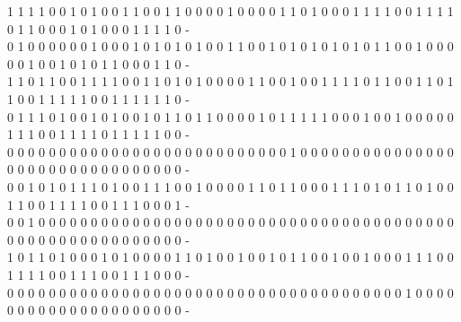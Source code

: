 \begin{center}
{1 1 1 1 0 0 1 0 1 0 0 1 1 0 0 1 1 0 0 0 0 1 0 0 0 0 1 1 0 1 0 0 0 1 1 1 1 0 0 1 1 1 1 0 1 1 0 0 0 1 0 1 0 0 0 1 1 1 1 0 -\\ 
0 1 0 0 0 0 0 0 1 0 0 0 1 0 1 0 1 0 1 0 0 1 1 0 0 1 0 1 0 1 0 1 0 1 0 1 1 0 0 1 0 0 0 0 0 1 0 0 1 0 1 0 1 1 0 0 0 1 1 0 -\\ 
1 1 0 1 1 0 0 1 1 1 1 0 0 1 1 0 1 0 1 0 0 0 0 1 1 0 0 1 0 0 1 1 1 1 0 1 1 0 0 1 1 0 1 1 0 0 1 1 1 1 1 0 0 1 1 1 1 1 1 0 -\\ 
0 1 1 1 0 1 0 0 1 0 1 0 0 1 0 1 1 0 1 1 0 0 0 0 1 0 1 1 1 1 1 0 0 0 1 0 0 1 0 0 0 0 0 1 1 1 0 0 1 1 1 1 0 1 1 1 1 1 0 0 -\\ 
0 0 0 0 0 0 0 0 0 0 0 0 0 0 0 0 0 0 0 0 0 0 0 0 0 0 0 1 0 0 0 0 0 0 0 0 0 0 0 0 0 0 0 0 0 0 0 0 0 0 0 0 0 0 0 0 0 0 0 0 -\\ 
0 0 1 0 1 0 1 1 1 0 1 0 0 1 1 1 0 0 1 0 0 0 0 1 1 0 1 1 0 0 0 1 1 1 0 1 0 1 1 0 1 0 0 1 1 0 0 1 1 1 1 0 0 1 1 1 0 0 0 1 -\\ 
0 0 1 0 0 0 0 0 0 0 0 0 0 0 0 0 0 0 0 0 0 0 0 0 0 0 0 0 0 0 0 0 0 0 0 0 0 0 0 0 0 0 0 0 0 0 0 0 0 0 0 0 0 0 0 0 0 0 0 0 -\\ 
1 0 1 1 0 1 0 0 0 1 0 1 0 0 0 0 1 1 0 1 0 0 1 0 0 1 0 1 1 0 0 1 0 0 1 0 0 0 1 1 1 0 0 1 1 1 1 0 0 1 1 1 0 0 1 1 1 0 0 0 -\\ 
0 0 0 0 0 0 0 0 0 0 0 0 0 0 0 0 0 0 0 0 0 0 0 0 0 0 0 0 0 0 0 0 0 0 0 0 0 0 1 0 0 0 0 0 0 0 0 0 0 0 0 0 0 0 0 0 0 0 0 0 -\\ 
}
\end{center}